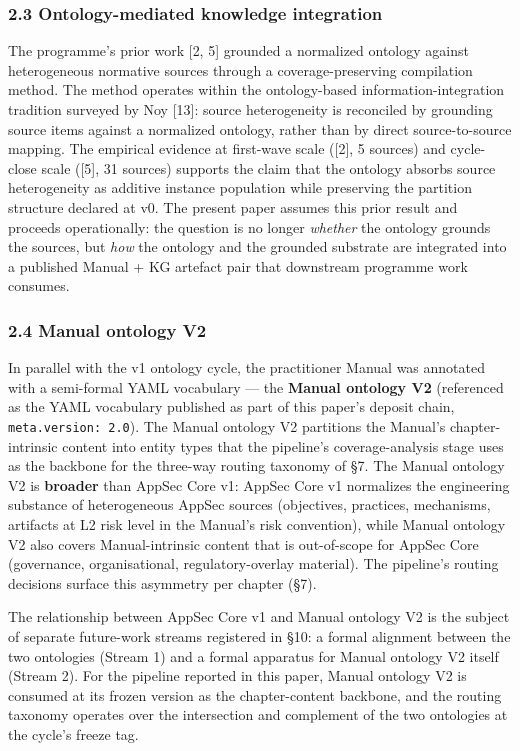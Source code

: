 \documentclass[
]{article}
\begin{document}
\subsubsection{2.3 Ontology-mediated knowledge
integration}\label{ontology-mediated-knowledge-integration}

The programme's prior work {[}2, 5{]} grounded a normalized ontology
against heterogeneous normative sources through a coverage-preserving
compilation method. The method operates within the ontology-based
information-integration tradition surveyed by Noy {[}13{]}: source
heterogeneity is reconciled by grounding source items against a
normalized ontology, rather than by direct source-to-source mapping. The
empirical evidence at first-wave scale ({[}2{]}, 5 sources) and
cycle-close scale ({[}5{]}, 31 sources) supports the claim that the
ontology absorbs source heterogeneity as additive instance population
while preserving the partition structure declared at v0. The present
paper assumes this prior result and proceeds operationally: the question
is no longer \emph{whether} the ontology grounds the sources, but
\emph{how} the ontology and the grounded substrate are integrated into a
published Manual + KG artefact pair that downstream programme work
consumes.

\subsubsection{2.4 Manual ontology V2}\label{manual-ontology-v2}

In parallel with the v1 ontology cycle, the practitioner Manual was
annotated with a semi-formal YAML vocabulary --- the \textbf{Manual
ontology V2} (referenced as the YAML vocabulary published as part of
this paper's deposit chain,
\texttt{meta.version:\ \textquotesingle{}2.0\textquotesingle{}}). The
Manual ontology V2 partitions the Manual's chapter-intrinsic content
into entity types that the pipeline's coverage-analysis stage uses as
the backbone for the three-way routing taxonomy of §7. The Manual
ontology V2 is \textbf{broader} than AppSec Core v1: AppSec Core v1
normalizes the engineering substance of heterogeneous AppSec sources
(objectives, practices, mechanisms, artifacts at L2 risk level in the
Manual's risk convention), while Manual ontology V2 also covers
Manual-intrinsic content that is out-of-scope for AppSec Core
(governance, organisational, regulatory-overlay material). The
pipeline's routing decisions surface this asymmetry per chapter (§7).

The relationship between AppSec Core v1 and Manual ontology V2 is the
subject of separate future-work streams registered in §10: a formal
alignment between the two ontologies (Stream 1) and a formal apparatus
for Manual ontology V2 itself (Stream 2). For the pipeline reported in
this paper, Manual ontology V2 is consumed at its frozen version as the
chapter-content backbone, and the routing taxonomy operates over the
intersection and complement of the two ontologies at the cycle's freeze
tag.
\end{document}

